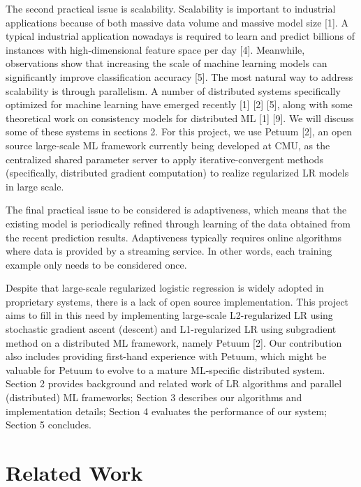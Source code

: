 \documentclass{article} %
\begin{document}
The second practical issue is scalability. Scalability is important to industrial applications because of both massive data volume and massive model size [1]. A typical industrial application nowadays is required to learn and predict billions of instances with high-dimensional feature space per day [4]. Meanwhile, observations show that increasing the scale of machine learning models can significantly improve classification accuracy [5]. The most natural way to address scalability is through parallelism. A number of distributed systems specifically optimized for machine learning have emerged recently [1] [2] [5], along with some theoretical work on consistency models for distributed ML [1] [9]. We will discuss some of these systems in sections 2. For this project, we use Petuum [2], an open source large-scale ML framework currently being developed at CMU, as the centralized shared parameter server to apply iterative-convergent methods (specifically, distributed gradient computation) to realize regularized LR models in large scale.

The final practical issue to be considered is adaptiveness, which means that the existing model is periodically refined through learning of the data obtained from the recent prediction results. Adaptiveness typically requires online algorithms where data is provided by a streaming service. In other words, each training example only needs to be considered once.

Despite that large-scale regularized logistic regression is widely adopted in proprietary systems, there is a lack of open source implementation. This project aims to fill in this need by implementing large-scale L2-regularized LR using stochastic gradient ascent (descent) and L1-regularized LR using subgradient method on a distributed ML framework, namely Petuum [2]. Our contribution also includes providing first-hand experience with Petuum, which might be valuable for Petuum to evolve to a mature ML-specific distributed system. Section 2 provides background and related work of LR algorithms and parallel (distributed) ML frameworks; Section 3 describes our algorithms and implementation details; Section 4 evaluates the performance of our system; Section 5 concludes. 

\section{Related Work}
\label{gen_inst}
\end{document}
